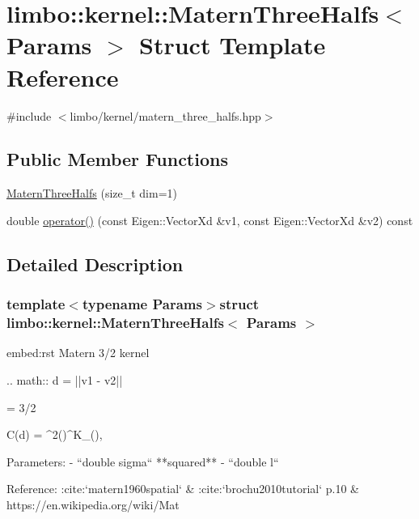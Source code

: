 \hypertarget{structlimbo_1_1kernel_1_1_matern_three_halfs}{}\section{limbo\+:\+:kernel\+:\+:Matern\+Three\+Halfs$<$ Params $>$ Struct Template Reference}
\label{structlimbo_1_1kernel_1_1_matern_three_halfs}


{\ttfamily \#include $<$limbo/kernel/matern\+\_\+three\+\_\+halfs.\+hpp$>$}

\subsection*{Public Member Functions}
\begin{DoxyCompactItemize}
\item 
\hyperlink{structlimbo_1_1kernel_1_1_matern_three_halfs_a2f46e1fb1e7239e1f1dccd422dee576e}{Matern\+Three\+Halfs} (size\+\_\+t dim=1)
\item 
double \hyperlink{structlimbo_1_1kernel_1_1_matern_three_halfs_affe5c6971e6afe32881603b857958a83}{operator()} (const Eigen\+::\+Vector\+Xd \&v1, const Eigen\+::\+Vector\+Xd \&v2) const 
\end{DoxyCompactItemize}


\subsection{Detailed Description}
\subsubsection*{template$<$typename Params$>$struct limbo\+::kernel\+::\+Matern\+Three\+Halfs$<$ Params $>$}

\begin{DoxyVerb}embed:rst
 Matern 3/2 kernel

 .. math::
   d = ||v1 - v2||

   \nu = 3/2

   C(d) = \sigma^2\Bigg(\sqrt{2\nu}\Bigg)^\nu K_\nu\Bigg(\sqrt{2\nu}\Bigg),


 Parameters:
  - ``double sigma`` **squared**
  - ``double l``

Reference: :cite:`matern1960spatial` & :cite:`brochu2010tutorial` p.10 & https://en.wikipedia.org/wiki/Mat%
\end{DoxyVerb}
 

